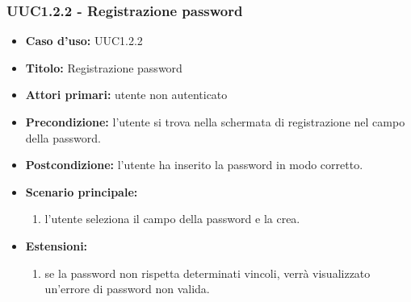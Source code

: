 \documentclass[casi-duso]{subfiles}
\begin{document}
\subsubsection{UUC1.2.2 - Registrazione password}%
\label{subsub:UUC1.2.2utente}
\begin{itemize}
  \item \textbf{Caso d’uso:} UUC1.2.2
  \item \textbf{Titolo:} Registrazione password
  \item \textbf{Attori primari:} utente non autenticato
  \item \textbf{Precondizione:} l'utente si trova nella schermata di registrazione nel campo della password.
  \item \textbf{Postcondizione:} l'utente ha inserito la password in modo corretto.
  \item \textbf{Scenario principale:}
        \begin{enumerate}
          \item l'utente seleziona il campo della password e la crea.
        \end{enumerate}
  \item \textbf{Estensioni:}
        \begin{enumerate}
          \item se la password non rispetta determinati vincoli, verrà visualizzato un'errore di password non valida.
        \end{enumerate}
\end{itemize}

\end{document}
